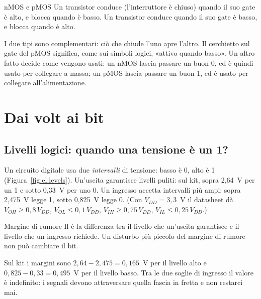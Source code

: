 \begin{definition}{nMOS e pMOS}
Un transistor  conduce (l'interruttore è chiuso) quando il suo gate
è alto, e blocca quando è basso. Un transistor  conduce quando il
suo gate è basso, e blocca quando è alto.
\end{definition}

I due tipi sono complementari: ciò che chiude l'uno apre l'altro. Il cerchietto
sul gate del pMOS significa, come sui simboli logici, «attivo quando basso».
Un altro fatto decide come vengono usati: un nMOS lascia passare un buon 0, ed
è quindi usato per collegare a massa; un pMOS lascia passare un buon 1, ed è
usato per collegare all'alimentazione.

\section{Dai volt ai bit}

\subsection{Livelli logici: quando una tensione è un 1?}

Un circuito digitale usa due \emph{intervalli} di tensione: basso è 0, alto è 1
(Figura~\ref{fig:el:levels}). Un'uscita garantisce livelli puliti: sul kit,
sopra 2,64~V per un 1 e sotto 0,33~V per uno 0. Un ingresso accetta intervalli
più ampi: sopra 2,475~V legge 1, sotto 0,825~V legge 0. (Con $V_{DD}=3,3$~V il
datasheet dà $V_{OH}\ge 0,8\,V_{DD}$, $V_{OL}\le 0,1\,V_{DD}$,
$V_{IH}\ge 0,75\,V_{DD}$, $V_{IL}\le 0,25\,V_{DD}$.)

\begin{definition}{Margine di rumore}
Il  è la differenza tra il livello che un'uscita
garantisce e il livello che un ingresso richiede. Un disturbo più piccolo del
margine di rumore non può cambiare il bit.
\end{definition}

Sul kit i margini sono $2,64-2,475=0,165$~V per il livello alto e
$0,825-0,33=0,495$~V per il livello basso. Tra le due soglie di ingresso il
valore è indefinito: i segnali devono attraversare quella fascia in fretta e
non restarci mai.

